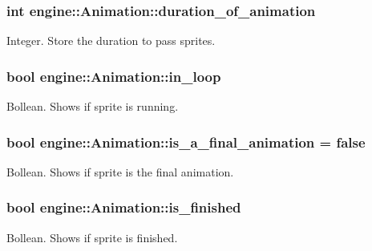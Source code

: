 \subsubsection[{\texorpdfstring{duration\+\_\+of\+\_\+animation}{duration_of_animation}}]{\setlength{\rightskip}{0pt plus 5cm}int engine\+::\+Animation\+::duration\+\_\+of\+\_\+animation}\hypertarget{classengine_1_1_animation_a2e2decb12d84400df1bda29edd9c9633}{}\label{classengine_1_1_animation_a2e2decb12d84400df1bda29edd9c9633}
Integer. Store the duration to pass sprites. 
\subsubsection[{\texorpdfstring{in\+\_\+loop}{in_loop}}]{\setlength{\rightskip}{0pt plus 5cm}bool engine\+::\+Animation\+::in\+\_\+loop}\hypertarget{classengine_1_1_animation_a16077db74242167b01a804227a93b6f9}{}\label{classengine_1_1_animation_a16077db74242167b01a804227a93b6f9}
Bollean. Shows if sprite is running. 
\subsubsection[{\texorpdfstring{is\+\_\+a\+\_\+final\+\_\+animation}{is_a_final_animation}}]{\setlength{\rightskip}{0pt plus 5cm}bool engine\+::\+Animation\+::is\+\_\+a\+\_\+final\+\_\+animation = false}\hypertarget{classengine_1_1_animation_a3c4b59c6598adccf765a30185ead8190}{}\label{classengine_1_1_animation_a3c4b59c6598adccf765a30185ead8190}
Bollean. Shows if sprite is the final animation. 
\subsubsection[{\texorpdfstring{is\+\_\+finished}{is_finished}}]{\setlength{\rightskip}{0pt plus 5cm}bool engine\+::\+Animation\+::is\+\_\+finished}\hypertarget{classengine_1_1_animation_a8a156351cd9b5f774f549dbc092ff1b1}{}\label{classengine_1_1_animation_a8a156351cd9b5f774f549dbc092ff1b1}
Bollean. Shows if sprite is finished. 
